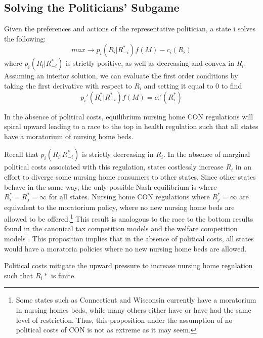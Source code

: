 \documentclass[../Main.tex]{subfiles}
\begin{document}
\subsection{Solving the Politicians' Subgame}

Given the preferences and actions of the representative politician, a state i solves the following:\begin{equation}max \rightarrow p_i(R_i|R_{-i}^*)f(M) -c_i(R_i)\end{equation} where $p_i(R_i|R_{-i}^*)$ is strictly positive, as well as decreasing and convex in $R_i$. Assuming an interior solution, we can evaluate the first order conditions by taking the first derivative with respect to $R_i$ and setting it equal to 0 to find \begin{equation}p_i'(R_i^*|R_{-i}^*)f(M) = c_i'(R_i^*)\end{equation} 

 \begin{Proposition}
In the absence of political costs, equilibrium nursing home CON regulations will spiral upward leading to a race to the top in health regulation such that all states have a moratorium of nursing home beds. 
\end{Proposition}

Recall that $p_i(R_i|R_{-i}^*)$ is strictly decreasing in $R_i$. In the absence of marginal political costs associated with this regulation, states costlessly increase $R_i$ in an effort to diverge some nursing home consumers to other states. Since other states behave in the same way, the only possible Nash equilibrium is where $R_i^* = R_j^* = \infty $ for all states. Nursing home CON regulations where $R_j^* = \infty $ are equivalent to the moratorium policy, where no new nursing home beds are allowed to be offered.\footnote{Some states such as Connecticut and Wisconsin currently have a moratorium in nursing homes beds, while many others either have or have had the same level of restriction. Thus, this proposition under the assumption of no political costs of CON is not as extreme as it may seem.} This result is analogous to the race to the bottom results found in the canonical tax competition models \citep{zodrow1986pigou, basinger2004remodeling} and the welfare competition models \citep{gramlich1984migration,peterson1989american,schram1998without}. This proposition implies that in the absence of political costs, all states would have a moratoria policies where no new nursing home beds are allowed.


\begin{Proposition}
Political costs mitigate the upward pressure to increase nursing home regulation such that $R_i*$ is finite. 
\end{Proposition}
\end{document}
